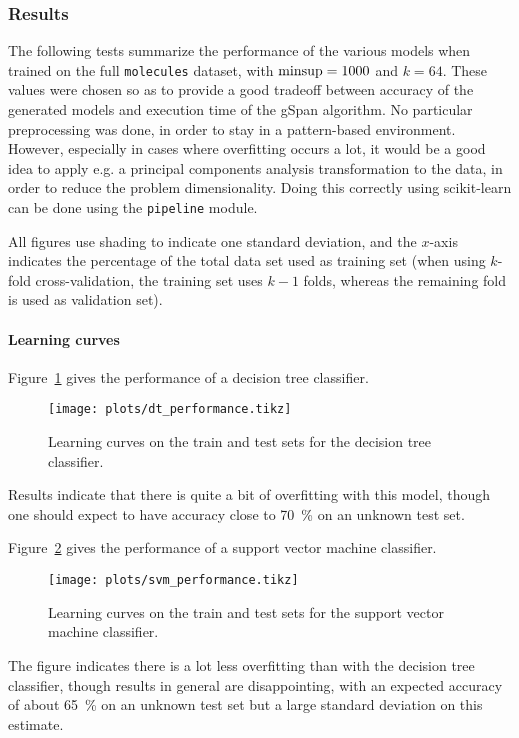 \documentclass{sigkddExp}
\newcommand{\py}[1]{\texttt{#1}}
\newcommand{\gspan}{\textsf{gSpan}}
\begin{document}
\subsubsection{Results}
The following tests summarize the performance of the various models when trained on the full \texttt{molecules} dataset, with \(\textnormal{minsup} = 1000\) and \(k = 64\).
These values were chosen so as to provide a good tradeoff between accuracy of the generated models and execution time of the \gspan{} algorithm.
No particular preprocessing was done, in order to stay in a pattern-based environment.
However, especially in cases where overfitting occurs a lot, it would be a good idea to apply e.g. a principal components analysis transformation to the data, in order to reduce the problem dimensionality.
Doing this correctly using scikit-learn can be done using the \py{pipeline} module.

All figures use shading to indicate one standard deviation, and the \(x\)-axis indicates the percentage of the total data set used as training set (when using \(k\)-fold cross-validation, the training set uses \(k-1\) folds, whereas the remaining fold is used as validation set).

\paragraph{Learning curves}
Figure~\ref{fig:dt_performance} gives the performance of a decision tree classifier.
\begin{figure}[!hbtp]
	\centering
	\texttt{[image: plots/dt\_performance.tikz]}
	\caption{Learning curves on the train and test sets for the decision tree classifier.}
	\label{fig:dt_performance}
\end{figure}
Results indicate that there is quite a bit of overfitting with this model, though one should expect to have accuracy close to \SI{70}{\percent} on an unknown test set.

Figure~\ref{fig:svm_performance} gives the performance of a support vector machine classifier.
\begin{figure}[!hbtp]
	\centering
	\texttt{[image: plots/svm\_performance.tikz]}
	\caption{Learning curves on the train and test sets for the support vector machine classifier.}
	\label{fig:svm_performance}
\end{figure}
The figure indicates there is a lot less overfitting than with the decision tree classifier, though results in general are disappointing, with an expected accuracy of about \SI{65}{\percent} on an unknown test set but a large standard deviation on this estimate.
\end{document}
